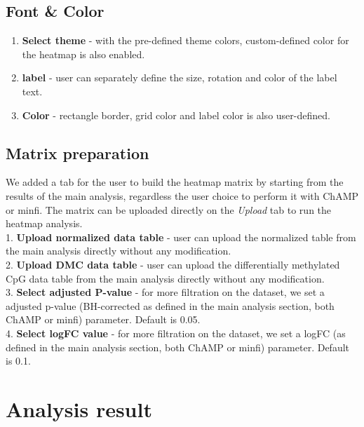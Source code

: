 \documentclass[
  a4paper,
  oneside,
  open=any]{scrreport}
\providecommand{\tightlist}{%
  \setlength{\itemsep}{0pt}\setlength{\parskip}{0pt}}\usepackage{longtable,booktabs,array}
\begin{document}
\hypertarget{font-color}{%
\subsection{Font \& Color}\label{font-color}}

\begin{enumerate}
\def\labelenumi{\arabic{enumi}.}
\tightlist
\item
  \textbf{Select theme} - with the pre-defined theme colors,
  custom-defined color for the heatmap is also enabled.
\item
  \textbf{label} - user can separately define the size, rotation and
  color of the label text.
\item
  \textbf{Color} - rectangle border, grid color and label color is also
  user-defined.
\end{enumerate}

\hypertarget{matrix-preparation}{%
\subsection{Matrix preparation}\label{matrix-preparation}}

We added a tab for the user to build the heatmap matrix by starting from
the results of the main analysis, regardless the user choice to perform
it with ChAMP or minfi. The matrix can be uploaded directly on the
\emph{Upload} tab to run the heatmap analysis.\\
1. \textbf{Upload normalized data table} - user can upload the
normalized table from the main analysis directly without any
modification.\\
2. \textbf{Upload DMC data table} - user can upload the differentially
methylated CpG data table from the main analysis directly without any
modification.\\
3. \textbf{Select adjusted P-value} - for more filtration on the
dataset, we set a adjusted p-value (BH-corrected as defined in the main
analysis section, both ChAMP or minfi) parameter. Default is 0.05.\\
4. \textbf{Select logFC value} - for more filtration on the dataset, we
set a logFC (as defined in the main analysis section, both ChAMP or
minfi) parameter. Default is 0.1.

\hypertarget{analysis-result-1}{%
\section{Analysis result}\label{analysis-result-1}}
\end{document}
